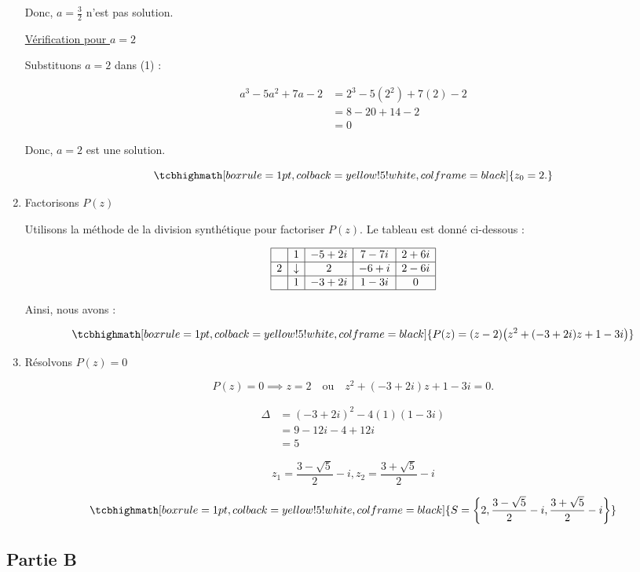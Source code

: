 \documentclass[12pt,a4paper]{article}
\begin{document}
\begin{enumerate}
Donc, $a = \frac{3}{2}$ n'est pas solution.

\underline{Vérification pour $a = 2$}

Substituons $a = 2$ dans (1) :

\begin{align*}
a^3 - 5a^2 + 7a - 2 &= 2^3 - 5(2^2) + 7(2) - 2\\
										&=8 - 20 + 14 - 2\\
										&=0
\end{align*}

Donc, $a = 2$ est une solution.

\[
\tcbhighmath[boxrule=1pt, colback=yellow!5!white, colframe=black]{ z_0 = 2. }
\]
\item Factorisons $P(z)$

Utilisons la méthode de la division synthétique pour factoriser $P(z)$. Le tableau est donné ci-dessous :

\[
\begin{array}{|c|c|c|c|c|}
\hline
\text{ } & 1 & -5+2i & 7-7i & 2+6i \\ 
\hline
2 & \downarrow & 2 & -6+i & 2-6i \\ 
\hline
\text{ } & 1 & -3+2i & 1-3i & 0 \\ 
\hline
\end{array}
\]

Ainsi, nous avons :

\[
\tcbhighmath[boxrule=1pt, colback=yellow!5!white, colframe=black]{ P(z) = (z - 2)\big(z^2 + (-3+2i)z + 1-3i\big) }
\]
\item Résolvons $P(z) = 0$

\[
P(z) = 0 \implies z = 2 \quad \text{ou} \quad z^2 + (-3+2i)z + 1-3i = 0.
\]

\begin{align*}
\Delta &= (-3+2i)^2 - 4(1)(1-3i)\\
 			 &= 9 - 12i - 4 + 12i\\
	     &= 5
\end{align*}

\[
z_{1} = \frac{3-\sqrt{5}}{2}-i, z_{2} = \frac{3+\sqrt{5}}{2}-i
\]

\[
\tcbhighmath[boxrule=1pt, colback=yellow!5!white, colframe=black]{ S = \left\{ 2, \frac{3-\sqrt{5}}{2}-i, \frac{3+\sqrt{5}}{2}-i \right\} }
\]
\end{enumerate}
\subsection*{ Partie B}
\end{document}
